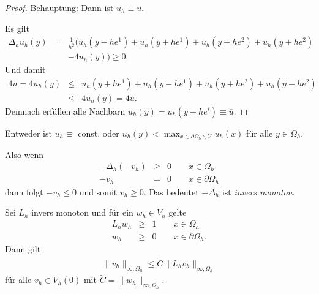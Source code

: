 \begin{Beispiel}
\begin{enumerate}[A)]
\begin{proof}
            Behauptung: Dann ist $u_h \equiv \overline u$.

            Es gilt
            \begin{eqnarray*}
                    \Delta_h u_h(y)
                &=& \frac{1}{h^2} \bigl(u_h \left(y - h e^1\right)
                    + u_h \left(y + h e^1\right) + u_h \left(y - h e^2\right)
                    + u_h \left(y + h e^2\right) \\
                    &&- 4 u_h(y)\bigr) \ge 0.
            \end{eqnarray*}
            Und damit
            \begin{eqnarray*}
                      4 \overline u = 4 u_h(y)
                &\le& u_h \left(y + h e^1\right) + u_h\left(y - h e^1\right)
                      + u_h \left(y + h e^2\right) + u_h\left(y - h e^2\right) \\
                &\le& 4 u_h(y) = 4 \overline u.
            \end{eqnarray*}
            Demnach erfüllen alle Nachbarn
            $u_h(y) = u_h\left(y \pm h e^i\right) \equiv \overline u$.
	    \end{proof}
        Entweder ist $u_h \equiv$ const. oder $u_h(y) < \max_{x\in
        \partial\Omega_h \backslash \mathcal{V}} u_h(x)$ für alle $y\in
        \Omega_h$.

	    Also wenn
	    \begin{eqnarray*}
            -\Delta_h (-v_h) &\ge& 0 \qquad x \in \Omega_h \\
            -v_h &=& 0 \qquad x \in \partial \Omega_h 
	    \end{eqnarray*}
	    dann folgt $-v_h \le 0$ und somit $v_h \ge 0$. Das bedeutet
	    $-\Delta_h$ ist \emph{invers monoton}.
    \end{enumerate}
\end{Beispiel}


\begin{Satz}
    \label{satz:2.8}
    Sei $L_h$ invers monoton und für ein $w_h \in V_h$ gelte
    \begin{eqnarray*}
        L_h w_h &\ge& 1 \qquad x \in \Omega_h \\
        w_h &\ge& 0 \qquad x \in \partial \Omega_h.
    \end{eqnarray*}
    Dann gilt
    \begin{eqnarray*}
            \|v_h\|_{\infty, \Omega_h}
        \le \tilde C \|L_h v_h\|_{\infty, \Omega_h}
    \end{eqnarray*}
    für alle $v_h \in V_h(0)$ mit $\tilde C = \|w_h\|_{\infty, \Omega_h}$.
\end{Satz}



